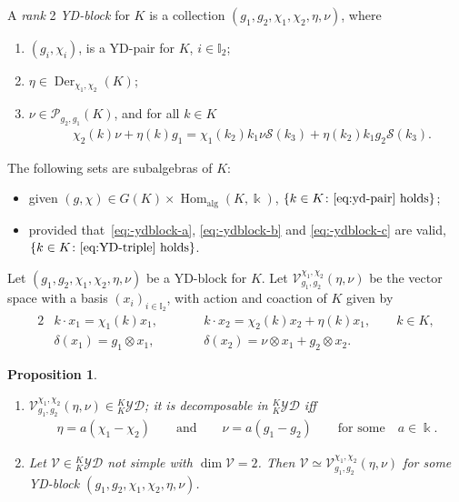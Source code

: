 \documentclass[pdftex]{sigma}
\numberwithin{equation}{section}
\newtheorem{Proposition}[Theorem]{Proposition}
 { \theoremstyle{definition}
\newtheorem{Definition}[Theorem]{Definition}
\newtheorem{Note}[Theorem]{Note}
\newtheorem{Example}[Theorem]{Example}
\newtheorem{Remark}[Theorem]{Remark} }
\newcommand{\Der}{\operatorname{Der}}
\newcommand{\Hom}{\operatorname{Hom}}
\newcommand{\Pc}{{\mathcal{P}}}
\newcommand{\Ss}{\mathcal{S}}
\newcommand{\Vc}{{\mathcal{V}}}
\newcommand{\I}{{\mathbb I}}
\newcommand{\yd}[1]{{}_{#1}^{#1}\mathcal{YD}}
\begin{document}
\begin{Definition}
A \emph{rank} 2 \emph{YD-block} for $K$ is a collection $(g_1, g_2, \chi_1, \chi_2, \eta, \nu)$,
where{\samepage
\begin{enumerate}[label=$(\alph*)$]\itemsep=0pt
\item\label{eq:-ydblock-a} $(g_i, \chi_i)$, is a YD-pair for $K$, $i \in \I_2$;

\item\label{eq:-ydblock-b} $\eta \in \Der_{\chi_1,\chi_2}(K)$;

\item\label{eq:-ydblock-c} $\nu \in \Pc_{g_2,g_1}(K)$, and for all $k\in K$
\begin{align}\label{eq:YD-triple}
&\chi_2(k) \nu + \eta(k) g_1 = \chi_1(k_2) k_1 \nu \Ss(k_3)
+ \eta(k_2) k_1 g_2 \Ss(k_3).
\end{align}
\end{enumerate}}
\end{Definition}

\begin{Remark} The following sets are subalgebras of $K$:
\begin{itemize}\itemsep=0pt
\item given $(g, \chi) \in G(K) \times \Hom_{\text{alg}}(K, \Bbbk)$, $\{k\in K\colon \eqref{eq:yd-pair} \text{ holds} \}$;

\item provided that~\ref{eq:-ydblock-a}, \ref{eq:-ydblock-b} and \ref{eq:-ydblock-c} are valid, $\{k\in K\colon \eqref{eq:YD-triple} \text{ holds} \}$.
\end{itemize}
\end{Remark}

Let $(g_1, g_2, \chi_1, \chi_2, \eta, \nu)$ be a YD-block for $K$.
Let $\Vc_{g_1, g_2}^{\chi_1, \chi_2}(\eta, \nu)$ be the vector space with a basis $(x_i)_{i\in\I_2}$,
with action and coaction of $K$ given by
\begin{alignat*}{2}
&k\cdot x_1 = \chi_1(k) x_1,\qquad&& k\cdot x_2=\chi_2(k) x_2 + \eta(k)x_{1},\qquad k\in K,
\\
&\delta(x_1) = g_1\otimes x_1, && \delta(x_2) = \nu\otimes x_1 + g_2\otimes x_2.
\end{alignat*}

\begin{Proposition}\quad%
\begin{enumerate}[label=$(\roman*)$]\itemsep=0pt
\item%
$\Vc_{g_1, g_2}^{\chi_1, \chi_2}(\eta, \nu) \in \yd{K}$;
it is decomposable in $\yd{K}$ iff
\begin{gather*}%
\eta = a(\chi_1 - \chi_2)\qquad \text{and}\qquad \nu = a (g_1 - g_2)\qquad
\text{for some} \quad a\in \Bbbk.
\end{gather*}

\item%
Let $\Vc\in \yd{K}$ not simple with $\dim \Vc =2$.
Then $\Vc \simeq \Vc_{g_1, g_2}^{\chi_1, \chi_2}(\eta, \nu)$ for some YD-block $(g_1, g_2, \chi_1, \chi_2, \eta, \nu)$.
\end{enumerate}
\end{Proposition}
\end{document}
